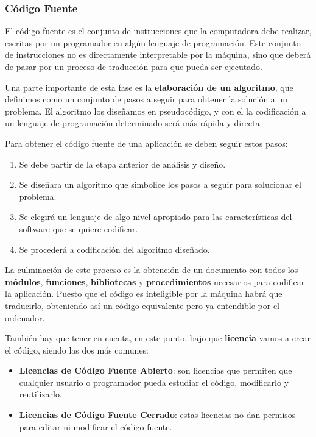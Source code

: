 \subsubsection{Código Fuente}

El código fuente es el conjunto de instrucciones que la computadora debe realizar, escritas por un programador en algún lenguaje de programación. Este conjunto de instrucciones no es directamente interpretable por la máquina, sino que deberá de pasar por un proceso de traducción para que pueda ser ejecutado.

Una parte importante de esta fase es la \textbf{elaboración de un algoritmo}, que definimos como un conjunto de pasos a seguir para obtener la solución a un problema. El algoritmo los diseñamos en pseudocódigo, y con el la codificación a un lenguaje de programación determinado será más rápida y directa.

Para obtener el código fuente de una aplicación se deben seguir estos pasos:
\begin{enumerate}
    \item Se debe partir de la etapa anterior de análisis y diseño.
    \item Se diseñara un algoritmo que simbolice los pasos a seguir para solucionar el problema.
    \item Se elegirá un lenguaje de algo nivel apropiado para las características del software que se quiere codificar.
    \item Se procederá a codificación del algoritmo diseñado.
\end{enumerate}

La culminación de este proceso es la obtención de un documento con todos los \textbf{módulos}, \textbf{funciones}, \textbf{bibliotecas} y \textbf{procedimientos} necesarios para codificar la aplicación. Puesto que el código es inteligible por la máquina habrá que traducirlo, obteniendo así un código equivalente pero ya entendible por el ordenador.

También hay que tener en cuenta, en este punto, bajo que \textbf{licencia} vamos a crear el código, siendo las dos más comunes:

\begin{itemize}
    \item \textbf{Licencias de Código Fuente Abierto}: son licencias que permiten que cualquier usuario o programador pueda estudiar el código, modificarlo y reutilizarlo.
    \item \textbf{Licencias de Código Fuente Cerrado}: estas licencias no dan permisos para editar ni modificar el código fuente.
\end{itemize}

